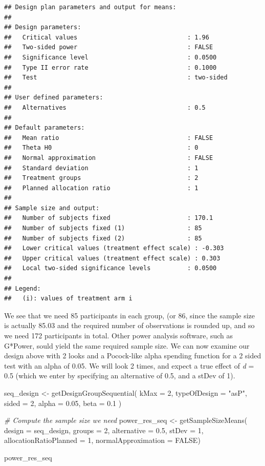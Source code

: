 \documentclass[
  oneside]{krantz}
\makeatletter
\newenvironment{Shaded}{\begin{snugshade}}{\end{snugshade}}
\newcommand{\AttributeTok}[1]{\textcolor[rgb]{0.61,0.61,0.61}{#1}}
\newcommand{\CommentTok}[1]{\textcolor[rgb]{0.37,0.37,0.37}{\textit{#1}}}
\newcommand{\ConstantTok}[1]{\textcolor[rgb]{0,0,0}{#1}}
\newcommand{\DecValTok}[1]{\textcolor[rgb]{0.06,0.06,0.06}{#1}}
\newcommand{\FloatTok}[1]{\textcolor[rgb]{0.06,0.06,0.06}{#1}}
\newcommand{\FunctionTok}[1]{\textcolor[rgb]{0,0,0}{#1}}
\newcommand{\NormalTok}[1]{#1}
\newcommand{\OtherTok}[1]{\textcolor[rgb]{0.37,0.37,0.37}{#1}}
\newcommand{\StringTok}[1]{\textcolor[rgb]{0.5,0.5,0.5}{#1}}
\newenvironment{kframe}{%
\medskip{}
\setlength{\fboxsep}{.8em}
 \def\at@end@of@kframe{}%
 \ifinner\ifhmode%
  \def\at@end@of@kframe{\end{minipage}}%
  \begin{minipage}{\columnwidth}%
 \fi\fi%
 \def\FrameCommand##1{\hskip\@totalleftmargin \hskip-\fboxsep
 \colorbox{shadecolor}{##1}\hskip-\fboxsep
     \hskip-\linewidth \hskip-\@totalleftmargin \hskip\columnwidth}%
 \MakeFramed {\advance\hsize-\width
   \@totalleftmargin\z@ \linewidth\hsize
   \@setminipage}}%
 {\par\unskip\endMakeFramed%
 \at@end@of@kframe}
\renewenvironment{Shaded}{\begin{kframe}}{\end{kframe}}
\makeatother
\begin{document}
\begin{verbatim}
## Design plan parameters and output for means:
## 
## Design parameters:
##   Critical values                              : 1.96 
##   Two-sided power                              : FALSE 
##   Significance level                           : 0.0500 
##   Type II error rate                           : 0.1000 
##   Test                                         : two-sided 
## 
## User defined parameters:
##   Alternatives                                 : 0.5 
## 
## Default parameters:
##   Mean ratio                                   : FALSE 
##   Theta H0                                     : 0 
##   Normal approximation                         : FALSE 
##   Standard deviation                           : 1 
##   Treatment groups                             : 2 
##   Planned allocation ratio                     : 1 
## 
## Sample size and output:
##   Number of subjects fixed                     : 170.1 
##   Number of subjects fixed (1)                 : 85 
##   Number of subjects fixed (2)                 : 85 
##   Lower critical values (treatment effect scale) : -0.303 
##   Upper critical values (treatment effect scale) : 0.303 
##   Local two-sided significance levels          : 0.0500 
## 
## Legend:
##   (i): values of treatment arm i
\end{verbatim}

We see that we need 85 participants in each group, (or 86, since the sample size is actually 85.03 and the required number of observations is rounded up, and so we need 172 participants in total. Other power analysis software, such as G*Power, sould yield the same required sample size. We can now examine our design above with 2 looks and a Pocock-like alpha spending function for a 2 sided test with an alpha of 0.05. We will look 2 times, and expect a true effect of \emph{d} = 0.5 (which we enter by specifying an alternative of 0.5, and a stDev of 1).

\begin{Shaded}
\begin{Highlighting}[]
\NormalTok{seq\_design }\OtherTok{\textless{}{-}} \FunctionTok{getDesignGroupSequential}\NormalTok{(}
  \AttributeTok{kMax =} \DecValTok{2}\NormalTok{,}
  \AttributeTok{typeOfDesign =} \StringTok{"asP"}\NormalTok{,}
  \AttributeTok{sided =} \DecValTok{2}\NormalTok{,}
  \AttributeTok{alpha =} \FloatTok{0.05}\NormalTok{,}
  \AttributeTok{beta =} \FloatTok{0.1}
\NormalTok{  )}

\CommentTok{\# Compute the sample size we need}
\NormalTok{power\_res\_seq }\OtherTok{\textless{}{-}} \FunctionTok{getSampleSizeMeans}\NormalTok{(}
  \AttributeTok{design =}\NormalTok{ seq\_design,}
  \AttributeTok{groups =} \DecValTok{2}\NormalTok{,}
  \AttributeTok{alternative =} \FloatTok{0.5}\NormalTok{, }
  \AttributeTok{stDev =} \DecValTok{1}\NormalTok{, }
  \AttributeTok{allocationRatioPlanned =} \DecValTok{1}\NormalTok{,}
  \AttributeTok{normalApproximation =} \ConstantTok{FALSE}\NormalTok{)}

\NormalTok{power\_res\_seq}
\end{Highlighting}
\end{Shaded}
\end{document}
